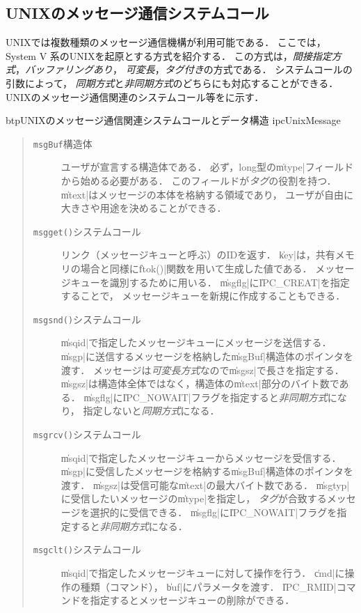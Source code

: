 \subsection{UNIXのメッセージ通信システムコール}
UNIXでは複数種類のメッセージ通信機構が利用可能である．
ここでは，System V 系のUNIXを起原とする方式を紹介する．
この方式は，\emph{間接指定方式}，\emph{バッファリングあり}，
\emph{可変長}，\emph{タグ付き}の方式である．
システムコールの引数によって，
\emph{同期方式}と\emph{非同期方式}のどちらにも対応することができる．
UNIXのメッセージ通信関連のシステムコール等をに示す．

\begin{myfig}{btp}{UNIXのメッセージ通信関連システムコールとデータ構造}
  {ipcUnixMessage}
  
\end{myfig}

\begin{quote}
  \begin{description}
  \item [\texttt{msgBuf}構造体]
    ユーザが宣言する構造体である．
    必ず，long型の\|mtype|フィールドから始める必要がある．
    このフィールドが\emph{タグ}の役割を持つ．
    \|mtext|はメッセージの本体を格納する領域であり，
    ユーザが自由に大きさや用途を決めることができる．
  \item [\texttt{msgget()}システムコール]
    リンク（メッセージキューと呼ぶ）のIDを返す．
    \|key|は，共有メモリの場合と同様に\|ftok()|関数を用いて生成した値である．
    メッセージキューを識別するために用いる．
    \|msgflg|に\|IPC_CREAT|を指定することで，
    メッセージキューを新規に作成することもできる．
  \item [\texttt{msgsnd()}システムコール]
    \|msqid|で指定したメッセージキューにメッセージを送信する．
    \|msgp|に送信するメッセージを格納した\|msgBuf|構造体のポインタを渡す．
    メッセージは\emph{可変長方式}なので\|msgsz|で長さを指定する．
    \|msgsz|は構造体全体ではなく，構造体の\|mtext|部分のバイト数である．
    \|msgflg|に\|IPC_NOWAIT|フラグを指定すると\emph{非同期方式}になり，
    指定しないと\emph{同期方式}になる．
  \item [\texttt{msgrcv()}システムコール]
    \|msqid|で指定したメッセージキューからメッセージを受信する．
    \|msgp|に受信したメッセージを格納する\|msgBuf|構造体のポインタを渡す．
    \|msgsz|は受信可能な\|mtext|の最大バイト数である．
    \|msgtyp|に受信したいメッセージの\|mtype|を指定し，
    \emph{タグ}が合致するメッセージを選択的に受信できる．
    \|msgflg|に\|IPC_NOWAIT|フラグを指定すると\emph{非同期方式}になる．
  \item [\texttt{msgclt()}システムコール]
    \|msqid|で指定したメッセージキューに対して操作を行う．
    \|cmd|に操作の種類（コマンド），
    \|buf|にパラメータを渡す．
    \|IPC_RMID|コマンドを指定するとメッセージキューの削除ができる．
  \end{description}
\end{quote}

